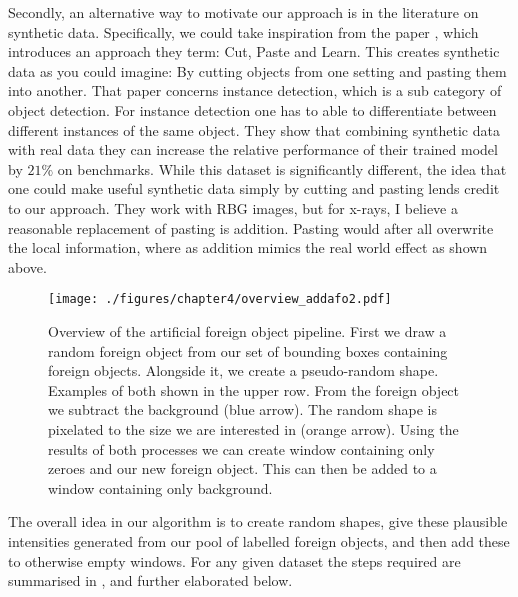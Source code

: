 Secondly, an alternative way to motivate our approach is in the literature on synthetic data. 
Specifically, we could take inspiration from the paper \cite{dwibediCutPasteLearn2017}, 
which introduces an approach they term: Cut, Paste and Learn.
This creates synthetic data as you could imagine: By cutting objects from one setting and pasting them into another.
That paper concerns instance detection, which is a sub category of object detection. 
For instance detection one has to able to differentiate between different instances of the same object. 
They show that combining synthetic data with real data they can increase the relative performance of their trained model by $21\%$ on benchmarks. 
While this dataset is significantly different, the idea that one could make useful synthetic data simply by cutting and pasting lends credit to our approach. 
They work with RBG images, but for x-rays, I believe a reasonable replacement of pasting is addition. 
Pasting would after all overwrite the local information, where as addition mimics the real world effect as shown above.

\begin{figure}[h]
	\begin{whole}
		\texttt{[image: ./figures/chapter4/overview\_addafo2.pdf]}
		\caption{Overview of the artificial foreign object pipeline. First we draw a random foreign object from our set of bounding boxes containing foreign objects. Alongside it, we create a pseudo-random shape. Examples of both shown in the upper row. From the foreign object we subtract the background (blue arrow). The random shape is pixelated to the size we are interested in (orange arrow). Using the results of both processes we can create window containing only zeroes and our new foreign object. This can then be added to a window containing only background.}
		\label{fig:addafo_overview}
	\end{whole}	
\end{figure}

The overall idea in our algorithm is to create random shapes, give these plausible intensities generated from our pool of labelled foreign objects, and then add these to otherwise empty windows. For any given dataset the steps required are summarised in , and further elaborated below.

